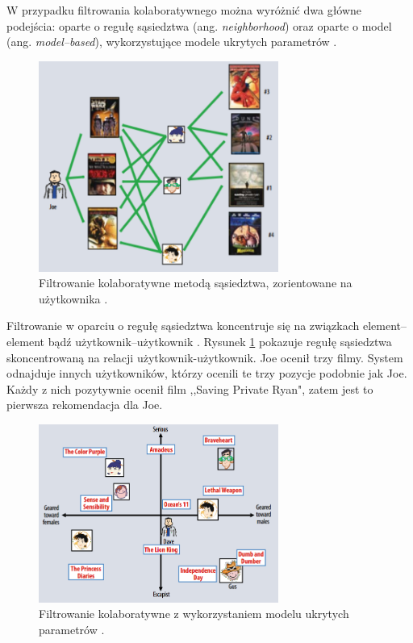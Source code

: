\documentclass[twoside]{iisthesis}
\begin{document}
	  W przypadku filtrowania kolaboratywnego można wyróżnić dwa główne podejścia: oparte o regułę sąsiedztwa (ang. \textit{neighborhood}) oraz oparte o model (ang. \textit{model--based}), wykorzystujące modele ukrytych parametrów \cite{id:AdvancesInCollaborativeFiltering,koren2009matrix}. 
	  
	  \begin{figure}[!ht] 
	  	\centering
	  	\includegraphics[width=0.7\textwidth]{cf}
	  	\caption{Filtrowanie kolaboratywne metodą sąsiedztwa,  zorientowane na użytkownika \protect\cite{koren2009matrix}.}
	  	\label{fig:cf}
	  \end{figure}
	  
	  Filtrowanie w oparciu o regułę sąsiedztwa koncentruje się na związkach element--element bądź użytkownik--użytkownik \cite{id:AdvancesInCollaborativeFiltering}.
	  Rysunek \ref{fig:cf} pokazuje regułę sąsiedztwa skoncentrowaną na relacji użytkownik-użytkownik. Joe ocenił trzy filmy. System odnajduje innych użytkowników, którzy ocenili te trzy pozycje podobnie jak Joe. Każdy z nich pozytywnie ocenił film ,,Saving Private Ryan", zatem jest to pierwsza rekomendacja dla Joe. 
	  
	  \begin{figure}[!ht] 
	  	\centering
	  	\includegraphics[width=0.7\textwidth]{cf2}
	  	\caption{Filtrowanie kolaboratywne z wykorzystaniem modelu ukrytych parametrów \protect\cite{koren2009matrix}.}
	  	\label{fig:cf2}
	  \end{figure}
	  
\end{document}
